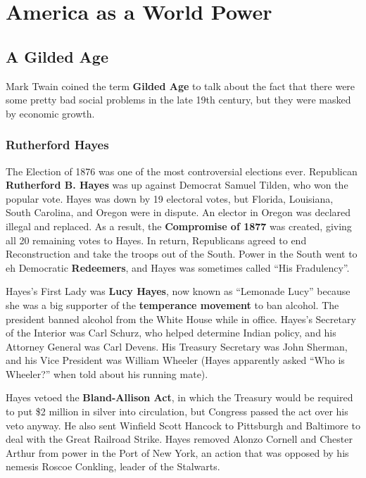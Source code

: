 \chapter{America as a World Power}

\section{A Gilded Age}

Mark Twain coined the term \textbf{Gilded Age} to talk about the fact that there were some pretty bad social problems
in the late 19th century, but they were masked by economic growth.

\subsection*{Rutherford Hayes}

The Election of 1876 was one of the most controversial elections ever.
Republican \textbf{Rutherford B. Hayes} was up against Democrat Samuel Tilden, who won the popular vote.
Hayes was down by 19 electoral votes, but Florida, Louisiana, South Carolina, and Oregon were in dispute.
An elector in Oregon was declared illegal and replaced.
As a result, the \textbf{Compromise of 1877} was created, giving all 20 remaining votes to Hayes.
In return, Republicans agreed to end Reconstruction and take the troops out of the South.
Power in the South went to eh Democratic \textbf{Redeemers},
and Hayes was sometimes called ``His Fradulency''.

Hayes's First Lady was \textbf{Lucy Hayes},
now known as ``Lemonade Lucy'' because she was a big supporter of the \textbf{temperance movement} to ban alcohol.
The president banned alcohol from the White House while in office.
Hayes's Secretary of the Interior was Carl Schurz, who helped determine Indian policy,
and his Attorney General was Carl Devens.
His Treasury Secretary was John Sherman,
and his Vice President was William Wheeler
(Hayes apparently asked ``Who is Wheeler?'' when told about his running mate).

Hayes vetoed the \textbf{Bland-Allison Act},
in which the Treasury would be required to put \$2 million in silver into circulation,
but Congress passed the act over his veto anyway.
He also sent Winfield Scott Hancock to Pittsburgh and Baltimore to deal with the Great Railroad Strike.
Hayes removed Alonzo Cornell and Chester Arthur from power in the Port of New York,
an action that was opposed by his nemesis Roscoe Conkling, leader of the Stalwarts.

